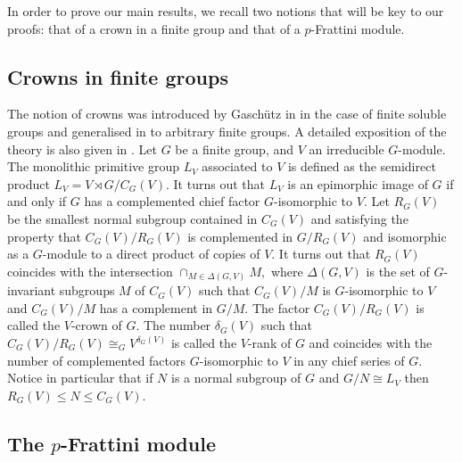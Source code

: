 \documentclass[a4paper,10pt]{amsart}
\theoremstyle{plain}
\theoremstyle{definition}
\begin{document}
\medskip

In order to prove our main results, we recall two notions that will be key to our proofs: that of a crown in a finite group and that of a $p$-Frattini module.


\subsection{Crowns in finite groups}

The notion of crowns was introduced by Gasch\"{u}tz  in \cite{praef} in the case of finite soluble groups and generalised in \cite{JL} to arbitrary finite groups.
A detailed exposition of the theory is also given in \cite[Section 1.3]{boez}.
Let $G$ be  a finite group, and $V$ an irreducible $G$-module. The monolithic primitive group $L_V$ associated to $V$ is defined as the semidirect product $L_V=V \rtimes G/C_G(V).$ It turns out that $L_V$ is an epimorphic image of $G$ if and only if $G$ has a complemented chief factor $G$-isomorphic to $V.$ Let $R_G(V)$ be the smallest normal subgroup contained in $C_G(V)$ and satisfying
the property that $C_G(V)/R_G(V)$ is complemented in $G/R_G(V)$ and isomorphic as a $G$-module to a direct product of copies of $V.$ It turns out that
$R_G(V)$ coincides with the intersection $\cap_{M \in \Delta(G,V)}M,$ where $\Delta(G,V)$ is the set of $G$-invariant
subgroups $M$ of $C_G(V)$ such that $C_G(V)/M$ is $G$-isomorphic to $V$ and $C_G(V)/M$ has a complement in $G/M.$ The
factor $C_G(V)/R_G(V)$ is called the $V$-crown of $G$. The number $\delta_G(V)$ such that $C_G(V)/R_G(V)\cong_G
V^{\delta_G(V)}$
is called the 
	$V$\nobreakdash-rank of $G$ and coincides with the number of
complemented factors $G$\nobreakdash-isomorphic to $V$ in any
chief series of $G.$ Notice in particular that if $N$ is a normal subgroup of $G$ and $G/N \cong L_V$ then $R_G(V)\leq N\leq C_G(V).$

\subsection{The $p$-Frattini module}\label{subsec:fratti_mod}
\end{document}
